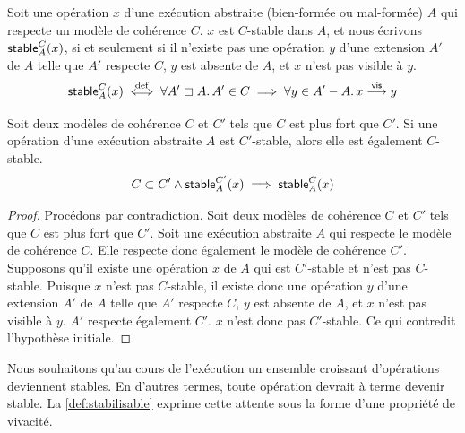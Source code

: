 \begin{definition}\label{def:stable}
Soit une opération $x$ d'une exécution abstraite (bien-formée ou mal-formée) $A$ qui respecte un modèle de cohérence $C$.
$x$ est $C$-stable dans $A$, et nous écrivons $\operatorname{\mathsf{stable}}_A^C(x)$, si et seulement si il n'existe pas une opération $y$ d'une extension $A'$ de $A$ telle que $A'$ respecte $C$, $y$ est absente de $A$, et $x$ n'est pas visible à $y$.
\begin{equation*}
  \operatorname{\mathsf{stable}}_A^C(x) \overset{\mathrm{def}}{\iff} \forall A' \sqsupset A \ldotp A' \in C \implies \forall y \in A' - A \ldotp x \overset{\mathsf{vis}}{\longrightarrow} y
\end{equation*}
\end{definition}


\begin{theorem}\label{th:stability-hierarchy}
Soit deux modèles de cohérence $C$ et $C'$ tels que $C$ est plus fort que $C'$.
Si une opération d'une exécution abstraite $A$ est $C'$-stable, alors elle est également $C$-stable.
\begin{equation*}
    C \subset C' \land \operatorname{\mathsf{stable}}_A^{C'}(x) \implies \operatorname{\mathsf{stable}}_A^{C}(x)
\end{equation*}
\end{theorem}

\begin{proof}
Procédons par contradiction.
Soit deux modèles de cohérence $C$ et $C'$ tels que $C$ est plus fort que $C'$.
Soit une exécution abstraite $A$ qui respecte le modèle de cohérence $C$.
Elle respecte donc également le modèle de cohérence $C'$.
Supposons qu'il existe une opération $x$ de $A$ qui est $C'$-stable et n'est pas $C$-stable.
Puisque $x$ n'est pas $C$-stable, il existe donc une opération $y$ d'une extension $A'$ de $A$ telle que $A'$ respecte $C$, $y$ est absente de $A$, et $x$ n'est pas visible à $y$.
$A'$ respecte également $C'$.
$x$ n'est donc pas $C'$-stable.
Ce qui contredit l'hypothèse initiale.
\end{proof}

Nous souhaitons qu'au cours de l'exécution un ensemble croissant d'opérations deviennent stables.
En d'autres termes, toute opération devrait à terme devenir stable.
La \autoref{def:stabilisable} exprime cette attente sous la forme d'une propriété de vivacité.

